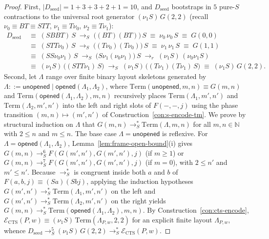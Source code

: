 \documentclass[11pt,reqno]{amsart}
\numberwithin{equation}{section}
\theoremstyle{plain}
\theoremstyle{definition}
\theoremstyle{remark}
\newcommand{\redS}{\to_S}
\newcommand{\redSs}{\to_S^*}
\begin{document}
\begin{proof}
First, $|D_{\mathrm{seed}}| = 1 + 3 + 3 + 2 + 1 = 10$, and $D_{\mathrm{seed}}$ bootstraps in $5$ pure-$S$ contractions to the universal root generator $(\nu_1 S)\,G(2,2)$ (recall $\nu_0 \equiv B T \equiv S T T$, $\nu_1 \equiv T \nu_0$, $\nu_2 \equiv T \nu_1$):
\begin{align*}
  D_{\mathrm{seed}} &\;\equiv\; (S B B T)\,S \;\redS\; \bigl((B T)(B T)\bigr)\,S \;\equiv\; \nu_0\,\nu_0\,S \;\equiv\; G(0,0) \\
  &\;\equiv\; (S T T \nu_0)\,S \;\redS\; \bigl((T \nu_0)(T \nu_0)\bigr)\,S \;\equiv\; \nu_1\,\nu_1\,S \;\equiv\; G(1,1) \\
  &\;\equiv\; (S S \nu_0 \nu_1)\,S \;\redS\; \bigl(S \nu_1 (\nu_0 \nu_1)\bigr)\,S \;\to_r\; (\nu_1 S)\,(\nu_0 \nu_1 S) \\
  &\;\equiv\; (\nu_1 S)\,\bigl((S T T \nu_1)\,S\bigr) \;\redS\; (\nu_1 S)\,\bigl((T \nu_1)(T \nu_1)\,S\bigr) \;\equiv\; (\nu_1 S)\,G(2, 2).
\end{align*}
Second, let $\Lambda$ range over finite binary layout skeletons generated by $\Lambda ::= \mathsf{unopened} \mid \mathsf{opened}(\Lambda_1, \Lambda_2)$, where $\mathrm{Term}(\mathsf{unopened}, m, n) \equiv G(m,n)$ and $\mathrm{Term}(\mathsf{opened}(\Lambda_1,\Lambda_2), m, n)$ recursively places $\mathrm{Term}(\Lambda_1, m', n')$ and $\mathrm{Term}(\Lambda_2, m', n')$ into the left and right slots of $F(-,-,j)$ using the phase transition $(m,n) \mapsto (m',n')$ of Construction~\ref{con:s-encode-tm}. We prove by structural induction on $\Lambda$ that $G(m,n) \redSs \mathrm{Term}(\Lambda, m, n)$ for all $m, n \in \mathbb{N}$ with $2 \le n$ and $m \le n$. The base case $\Lambda = \mathsf{unopened}$ is reflexive. For $\Lambda = \mathsf{opened}(\Lambda_1, \Lambda_2)$, Lemma~\ref{lem:frame-open-bound}(i) gives $G(m,n) \redS^6 F(G(m',n'), G(m',n'), j)$ (if $m \ge 1$) or $G(m,n) \redS^7 F(G(m',n'), G(m',n'), j)$ (if $m = 0$), with $2 \le n'$ and $m' \le n'$. Because $\redSs$ is congruent inside both $a$ and $b$ of $F(a,b,j) \equiv (S a)(S b j)$, applying the induction hypotheses $G(m',n') \redSs \mathrm{Term}(\Lambda_1, m', n')$ on the left and $G(m',n') \redSs \mathrm{Term}(\Lambda_2, m', n')$ on the right yields $G(m,n) \redSs \mathrm{Term}(\mathsf{opened}(\Lambda_1,\Lambda_2), m, n)$. By Construction~\ref{con:cts-encode}, $\mathcal{E}_{\mathrm{CTS}}(P,w) \equiv (\nu_1 S)\,\mathrm{Term}(\Lambda_{P,w}, 2, 2)$ for an explicit finite layout $\Lambda_{P,w}$, whence $D_{\mathrm{seed}} \redS^5 (\nu_1 S)\,G(2,2) \redSs \mathcal{E}_{\mathrm{CTS}}(P,w)$.
\end{proof}
\end{document}
